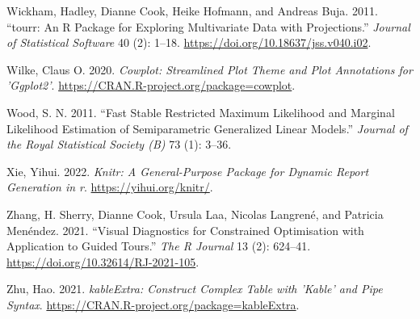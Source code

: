 \documentclass{article}
\newlength{\cslhangindent}
\newlength{\cslentryspacingunit} %
\newenvironment{CSLReferences}[2] %
 {%
  \setlength{\parindent}{0pt}
  \ifodd #1
  \let\oldpar\par
  \def\par{\hangindent=\cslhangindent\oldpar}
  \fi
  \setlength{\parskip}{#2\cslentryspacingunit}
 }%
 {}
\begin{document}
\begin{CSLReferences}{1}{0}
\leavevmode{}%
Wickham, Hadley, Dianne Cook, Heike Hofmann, and Andreas Buja. 2011.
{``{tourr}: An {R} Package for Exploring Multivariate Data with
Projections.''} \emph{Journal of Statistical Software} 40 (2): 1--18.
\url{https://doi.org/10.18637/jss.v040.i02}.

\leavevmode{}%
Wilke, Claus O. 2020. \emph{Cowplot: Streamlined Plot Theme and Plot
Annotations for 'Ggplot2'}.
\url{https://CRAN.R-project.org/package=cowplot}.

\leavevmode{}%
Wood, S. N. 2011. {``Fast Stable Restricted Maximum Likelihood and
Marginal Likelihood Estimation of Semiparametric Generalized Linear
Models.''} \emph{Journal of the Royal Statistical Society (B)} 73 (1):
3--36.

\leavevmode{}%
Xie, Yihui. 2022. \emph{Knitr: A General-Purpose Package for Dynamic
Report Generation in r}. \url{https://yihui.org/knitr/}.

\leavevmode{}%
Zhang, H. Sherry, Dianne Cook, Ursula Laa, Nicolas Langrené, and
Patricia Menéndez. 2021. {``Visual Diagnostics for Constrained
Optimisation with Application to Guided Tours.''} \emph{The R Journal}
13 (2): 624--41. \url{https://doi.org/10.32614/RJ-2021-105}.

\leavevmode{}%
Zhu, Hao. 2021. \emph{kableExtra: Construct Complex Table with 'Kable'
and Pipe Syntax}. \url{https://CRAN.R-project.org/package=kableExtra}.

\end{CSLReferences}



\end{document}
